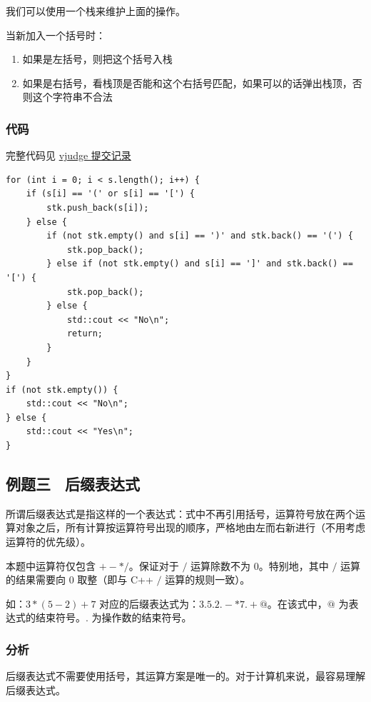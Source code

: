 \documentclass{report}
\begin{document}
我们可以使用一个栈来维护上面的操作。

当新加入一个括号时：

\begin{enumerate}
    \item 如果是左括号，则把这个括号入栈
    \item 如果是右括号，看栈顶是否能和这个右括号匹配，如果可以的话弹出栈顶，否则这个字符串不合法
\end{enumerate}

\subsubsection{代码}

完整代码见 \href{https://vjudge.net/solution/64150195/NWv7brPjI5uhjS91FLfu}{vjudge 提交记录}

\begin{verbatim}
for (int i = 0; i < s.length(); i++) {
    if (s[i] == '(' or s[i] == '[') {
        stk.push_back(s[i]);
    } else {
        if (not stk.empty() and s[i] == ')' and stk.back() == '(') {
            stk.pop_back();
        } else if (not stk.empty() and s[i] == ']' and stk.back() == '[') {
            stk.pop_back();
        } else {
            std::cout << "No\n";
            return;
        }
    }
}
if (not stk.empty()) {
    std::cout << "No\n";
} else {
    std::cout << "Yes\n";
}
\end{verbatim}

\subsection{例题三 \ 后缀表达式}

所谓后缀表达式是指这样的一个表达式：式中不再引用括号，运算符号放在两个运算对象之后，所有计算按运算符号出现的顺序，严格地由左而右新进行（不用考虑运算符的优先级）。

本题中运算符仅包含 $+ - * /$。保证对于 $/$ 运算除数不为 $0$。特别地，其中 $/$ 运算的结果需要向 $0$ 取整（即与 C++ $/$ 运算的规则一致）。

如：$3*(5-2)+7$ 对应的后缀表达式为：$3.5.2.-*7.+@$。在该式中，$@$ 为表达式的结束符号。$.$ 为操作数的结束符号。

\subsubsection{分析}

后缀表达式不需要使用括号，其运算方案是唯一的。对于计算机来说，最容易理解后缀表达式。
\end{document}

